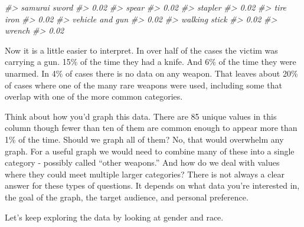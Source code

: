\documentclass[
]{krantz}
\makeatletter
\newenvironment{Shaded}{\begin{snugshade}}{\end{snugshade}}
\newcommand{\CommentTok}[1]{\textcolor[rgb]{0.37,0.37,0.37}{\textit{#1}}}
\newcommand{\DecValTok}[1]{\textcolor[rgb]{0.06,0.06,0.06}{#1}}
\newcommand{\FunctionTok}[1]{\textcolor[rgb]{0,0,0}{#1}}
\newcommand{\NormalTok}[1]{#1}
\newcommand{\SpecialCharTok}[1]{\textcolor[rgb]{0,0,0}{#1}}
\newenvironment{kframe}{%
\medskip{}
\setlength{\fboxsep}{.8em}
 \def\at@end@of@kframe{}%
 \ifinner\ifhmode%
  \def\at@end@of@kframe{\end{minipage}}%
  \begin{minipage}{\columnwidth}%
 \fi\fi%
 \def\FrameCommand##1{\hskip\@totalleftmargin \hskip-\fboxsep
 \colorbox{shadecolor}{##1}\hskip-\fboxsep
     \hskip-\linewidth \hskip-\@totalleftmargin \hskip\columnwidth}%
 \MakeFramed {\advance\hsize-\width
   \@totalleftmargin\z@ \linewidth\hsize
   \@setminipage}}%
 {\par\unskip\endMakeFramed%
 \at@end@of@kframe}
\renewenvironment{Shaded}{\begin{kframe}}{\end{kframe}}
\makeatother
\begin{document}
\begin{Shaded}
\begin{Highlighting}[]
\CommentTok{\#\textgreater{}                    samurai sword }
\CommentTok{\#\textgreater{}                             0.02 }
\CommentTok{\#\textgreater{}                            spear }
\CommentTok{\#\textgreater{}                             0.02 }
\CommentTok{\#\textgreater{}                          stapler }
\CommentTok{\#\textgreater{}                             0.02 }
\CommentTok{\#\textgreater{}                        tire iron }
\CommentTok{\#\textgreater{}                             0.02 }
\CommentTok{\#\textgreater{}                  vehicle and gun }
\CommentTok{\#\textgreater{}                             0.02 }
\CommentTok{\#\textgreater{}                    walking stick }
\CommentTok{\#\textgreater{}                             0.02 }
\CommentTok{\#\textgreater{}                           wrench }
\CommentTok{\#\textgreater{}                             0.02}
\end{Highlighting}
\end{Shaded}

Now it is a little easier to interpret. In over half of the cases the victim was carrying a gun. 15\% of the time they had a knife. And 6\% of the time they were unarmed. In 4\% of cases there is no data on any weapon. That leaves about 20\% of cases where one of the many rare weapons were used, including some that overlap with one of the more common categories.

Think about how you'd graph this data. There are 85 unique values in this column though fewer than ten of them are common enough to appear more than 1\% of the time. Should we graph all of them? No, that would overwhelm any graph. For a useful graph we would need to combine many of these into a single category - possibly called ``other weapons.'' And how do we deal with values where they could meet multiple larger categories? There is not always a clear answer for these types of questions. It depends on what data you're interested in, the goal of the graph, the target audience, and personal preference.

Let's keep exploring the data by looking at gender and race.

\begin{Shaded}
\end{Shaded}
\end{document}

